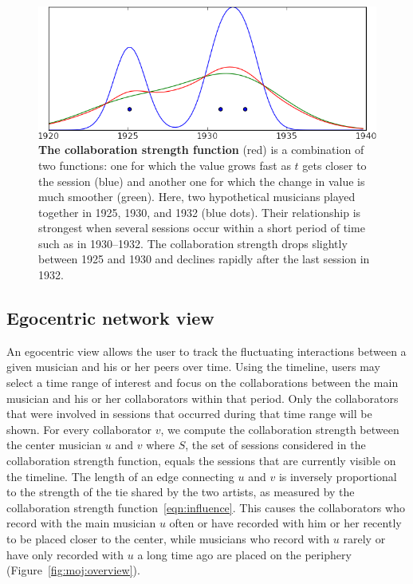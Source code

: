 \documentclass[12pt]{cmuthesis}
\begin{document}
  \begin{figure}[ht]
    \centering
    \includegraphics[width=0.6\linewidth]{figures/influence_plot.png}
    \caption{\textbf{The collaboration strength function} (red) is a combination of two functions: one for which  the value grows fast as $t$ gets closer to the session (blue) and another one for which the change in value is much smoother (green). Here, two hypothetical musicians played together in 1925, 1930, and 1932 (blue dots). Their relationship is strongest when several sessions occur within a short period of time such as in 1930--1932. The collaboration strength drops slightly between 1925 and 1930 and declines rapidly after the last session in 1932.}
    \label{fig:moj:infl_func}
  \end{figure}


  \subsection{Egocentric network view}

  An egocentric view allows the user to track the fluctuating interactions between a given musician and his or her peers over time. Using the timeline, users may select a time range of interest and focus on the collaborations between the main musician and his or her collaborators within that period. Only the collaborators that were involved in sessions that occurred during that time range will be shown. For every collaborator $v$, we compute the collaboration strength between the center musician $u$ and $v$ where $S$, the set of sessions considered in the collaboration strength function, equals the sessions that are currently visible on the timeline. The length of an edge connecting $u$ and $v$ is inversely proportional to the strength of the tie shared by the two artists, as measured by the collaboration strength function~\eqref{eqn:influence}. This causes the collaborators who record with the main musician $u$ often or have recorded with him or her recently to be placed closer to the center, while musicians who record with $u$ rarely or have only recorded with $u$ a long time ago are placed on the periphery (Figure~\ref{fig:moj:overview}).
\end{document}
